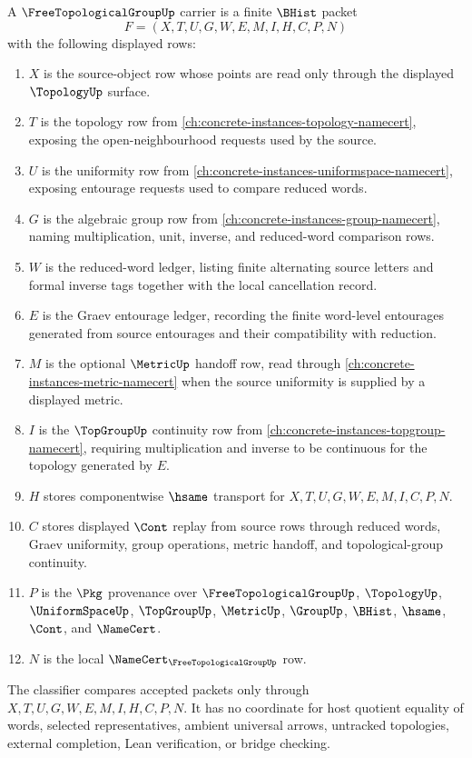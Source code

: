 \begin{definition}
\label{def:free-topological-group-carrier}
A $\FreeTopologicalGroupUp$ carrier is a finite $\BHist$ packet
$$
F=(X,T,U,G,W,E,M,I,H,C,P,N)
$$
with the following displayed rows:
\begin{enumerate}
\item $X$ is the source-object row whose points are read only through the displayed $\TopologyUp$ surface.
\item $T$ is the topology row from \autoref{ch:concrete-instances-topology-namecert}, exposing the open-neighbourhood requests used by the source.
\item $U$ is the uniformity row from \autoref{ch:concrete-instances-uniformspace-namecert}, exposing entourage requests used to compare reduced words.
\item $G$ is the algebraic group row from \autoref{ch:concrete-instances-group-namecert}, naming multiplication, unit, inverse, and reduced-word comparison rows.
\item $W$ is the reduced-word ledger, listing finite alternating source letters and formal inverse tags together with the local cancellation record.
\item $E$ is the Graev entourage ledger, recording the finite word-level entourages generated from source entourages and their compatibility with reduction.
\item $M$ is the optional $\MetricUp$ handoff row, read through \autoref{ch:concrete-instances-metric-namecert} when the source uniformity is supplied by a displayed metric.
\item $I$ is the $\TopGroupUp$ continuity row from \autoref{ch:concrete-instances-topgroup-namecert}, requiring multiplication and inverse to be continuous for the topology generated by $E$.
\item $H$ stores componentwise $\hsame$ transport for $X,T,U,G,W,E,M,I,C,P,N$.
\item $C$ stores displayed $\Cont$ replay from source rows through reduced words, Graev uniformity, group operations, metric handoff, and topological-group continuity.
\item $P$ is the $\Pkg$ provenance over $\FreeTopologicalGroupUp$, $\TopologyUp$, $\UniformSpaceUp$, $\TopGroupUp$, $\MetricUp$, $\GroupUp$, $\BHist$, $\hsame$, $\Cont$, and $\NameCert$.
\item $N$ is the local $\NameCert_{\FreeTopologicalGroupUp}$ row.
\end{enumerate}
The classifier compares accepted packets only through $X,T,U,G,W,E,M,I,H,C,P,N$. It has no coordinate for host quotient equality of words, selected representatives, ambient universal arrows, untracked topologies, external completion, Lean verification, or bridge checking.
\end{definition}

